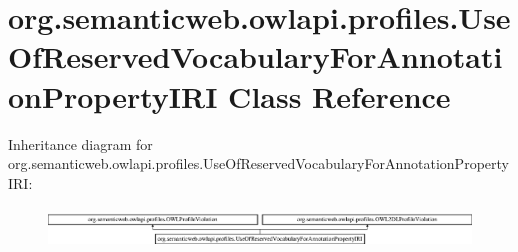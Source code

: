 \hypertarget{classorg_1_1semanticweb_1_1owlapi_1_1profiles_1_1_use_of_reserved_vocabulary_for_annotation_property_i_r_i}{\section{org.\-semanticweb.\-owlapi.\-profiles.\-Use\-Of\-Reserved\-Vocabulary\-For\-Annotation\-Property\-I\-R\-I Class Reference}
\label{classorg_1_1semanticweb_1_1owlapi_1_1profiles_1_1_use_of_reserved_vocabulary_for_annotation_property_i_r_i}
}
Inheritance diagram for org.\-semanticweb.\-owlapi.\-profiles.\-Use\-Of\-Reserved\-Vocabulary\-For\-Annotation\-Property\-I\-R\-I\-:\begin{figure}[H]
\begin{center}
\leavevmode
\includegraphics[height=1.113320cm]{classorg_1_1semanticweb_1_1owlapi_1_1profiles_1_1_use_of_reserved_vocabulary_for_annotation_property_i_r_i}
\end{center}
\end{figure}
